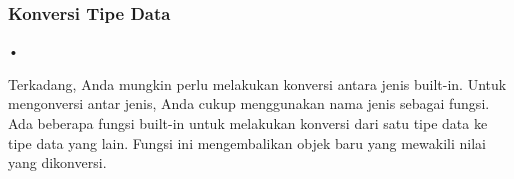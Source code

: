\documentclass{wileySix}
\begin{document}
\subsubsection{Konversi Tipe Data}
\begin{flushleft}
•
\end{flushleft}Terkadang, Anda mungkin perlu melakukan konversi antara jenis built-in. Untuk mengonversi antar jenis, Anda cukup menggunakan nama jenis sebagai fungsi.
Ada beberapa fungsi built-in untuk melakukan konversi dari satu tipe data ke tipe data yang lain. Fungsi ini mengembalikan objek baru yang mewakili nilai yang dikonversi.










\end{document}
